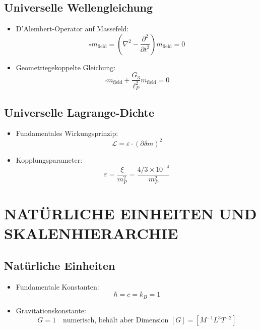 \documentclass[12pt,a4paper]{article}
\begin{document}
	\subsection{Universelle Wellengleichung}
	\begin{itemize}
		\item D'Alembert-Operator auf Massefeld:
		\begin{equation}
			\square m_{\text{field}} = \left(\nabla^2 - \frac{\partial^2}{\partial t^2}\right) m_{\text{field}} = 0
		\end{equation}
		
		\item Geometriegekoppelte Gleichung:
		\begin{equation}
			\square m_{\text{field}} + \frac{G_3}{\ell_P^2} m_{\text{field}} = 0
		\end{equation}
	\end{itemize}
	
	\subsection{Universelle Lagrange-Dichte}
	\begin{itemize}
		\item Fundamentales Wirkungsprinzip:
		\begin{equation}
			\boxed{\mathcal{L} = \varepsilon \cdot (\partial \delta m)^2}
		\end{equation}
		
		\item Kopplungsparameter:
		\begin{equation}
			\varepsilon = \frac{\xi}{m_P^2} = \frac{4/3 \times 10^{-4}}{m_P^2}
		\end{equation}
	\end{itemize}
	
	\section{NATÜRLICHE EINHEITEN UND SKALENHIERARCHIE}
	
	\subsection{Natürliche Einheiten}
	\begin{itemize}
		\item Fundamentale Konstanten:
		\begin{equation}
			\hbar = c = k_B = 1
		\end{equation}
		
		\item Gravitationskonstante:
		\begin{equation}
			G = 1 \quad \text{numerisch, behält aber Dimension } [G] = [M^{-1}L^3T^{-2}]
		\end{equation}
	\end{itemize}
	
\end{document}

